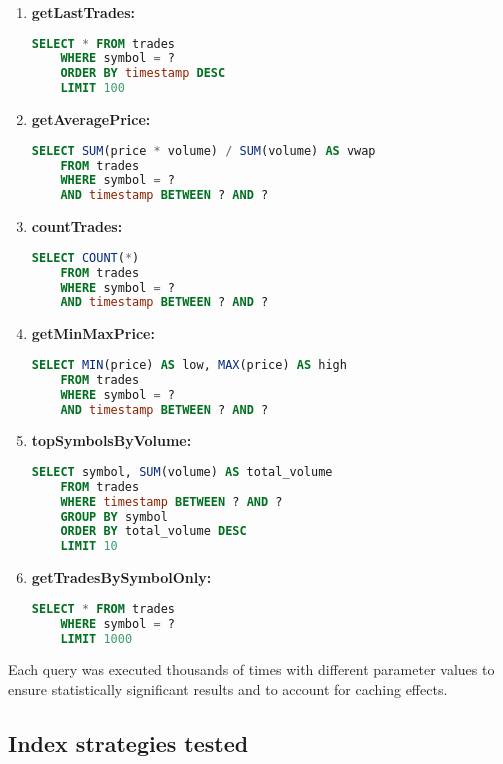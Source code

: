 \documentclass[11pt,a4paper]{article}
\begin{document}
\begin{enumerate}
    \item \textbf{getLastTrades:}
    \begin{lstlisting}[language=SQL]
    SELECT * FROM trades 
    WHERE symbol = ? 
    ORDER BY timestamp DESC 
    LIMIT 100
    \end{lstlisting}
    
    \item \textbf{getAveragePrice:}
    \begin{lstlisting}[language=SQL]
    SELECT SUM(price * volume) / SUM(volume) AS vwap
    FROM trades 
    WHERE symbol = ? 
    AND timestamp BETWEEN ? AND ?
    \end{lstlisting}
    
    \item \textbf{countTrades:}
    \begin{lstlisting}[language=SQL]
    SELECT COUNT(*) 
    FROM trades 
    WHERE symbol = ? 
    AND timestamp BETWEEN ? AND ?
    \end{lstlisting}
    
    \item \textbf{getMinMaxPrice:}
    \begin{lstlisting}[language=SQL]
    SELECT MIN(price) AS low, MAX(price) AS high
    FROM trades 
    WHERE symbol = ? 
    AND timestamp BETWEEN ? AND ?
    \end{lstlisting}
    
    \item \textbf{topSymbolsByVolume:}
    \begin{lstlisting}[language=SQL]
    SELECT symbol, SUM(volume) AS total_volume
    FROM trades 
    WHERE timestamp BETWEEN ? AND ?
    GROUP BY symbol
    ORDER BY total_volume DESC
    LIMIT 10
    \end{lstlisting}
    
    \item \textbf{getTradesBySymbolOnly:}
    \begin{lstlisting}[language=SQL]
    SELECT * FROM trades
    WHERE symbol = ?
    LIMIT 1000
    \end{lstlisting}
\end{enumerate}

Each query was executed thousands of times with different parameter values to ensure statistically significant results and to account for caching effects.

\subsection{Index strategies tested}
\end{document}
